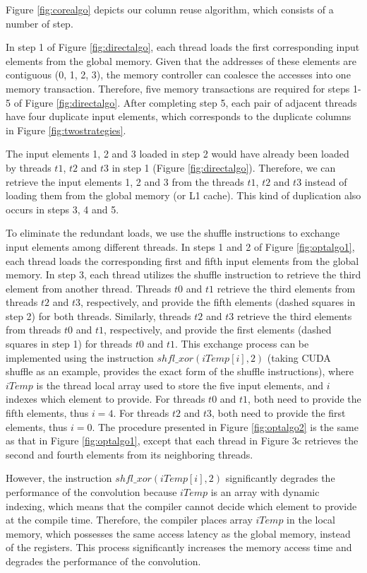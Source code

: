 Figure \ref{fig:corealgo} depicts our column reuse algorithm, which consists of a number of step.

 In step 1 of Figure \ref{fig:directalgo}, each thread loads the first corresponding input elements from the
global memory. Given that the addresses of these elements are contiguous (0, 1, 2, 3), the memory controller can coalesce the accesses into
one memory transaction. Therefore, five memory transactions are required for steps 1-5 of Figure \ref{fig:directalgo}. After completing step 5, each pair of adjacent threads have four
duplicate input elements, which corresponds to the duplicate columns in Figure \ref{fig:twostrategies}.

The input elements 1, 2 and 3 loaded in step 2 would have already been loaded by threads $t1$, $t2$ and $t3$ in step 1 (Figure
\ref{fig:directalgo}). Therefore, we can retrieve the input elements 1, 2 and 3 from the threads $t1$, $t2$ and $t3$ instead of loading
them from the global memory (or L1 cache). This kind of duplication also occurs in steps 3, 4 and 5.

To eliminate the redundant loads, we use the shuffle instructions to exchange input elements among different threads. In steps 1
and 2 of Figure \ref{fig:optalgo1}, each thread loads the corresponding first and fifth input elements from the global memory. In step 3, each
thread utilizes the shuffle instruction to retrieve the third element from another thread. Threads $t0$ and $t1$ retrieve the third elements
from threads $t2$ and $t3$, respectively, and provide the fifth elements (dashed squares in step 2) for both threads.
Similarly, threads $t2$ and $t3$ retrieve the third elements from threads $t0$ and $t1$, respectively, and provide the first
elements (dashed squares in step 1) for threads $t0$ and $t1$. This exchange process can be implemented using the instruction
$shfl\_xor(iTemp[i],2)$ (taking CUDA shuffle as an example, \cite{CUDAtoolkit} provides the exact form of the shuffle instructions), where $iTemp$ is the thread local
array used to store the five input elements, and $i$ indexes which element to provide. For threads $t0$ and $t1$, both need to provide the fifth
elements, thus $i=4$. For threads $t2$ and $t3$, both need to provide the first elements, thus $i=0$. The procedure presented in Figure  \ref{fig:optalgo2} is the same as that in Figure \ref{fig:optalgo1}, except that each thread in Figure 3c retrieves the second and fourth elements from its neighboring threads.

However, the instruction $shfl\_xor(iTemp[i],2)$ significantly degrades the performance of the convolution because $iTemp$ is an array with
dynamic indexing, which means that the compiler cannot decide which element to provide at the compile time. Therefore, the compiler
places array $iTemp$ in the local memory, which possesses the same access latency as the global memory, instead of the registers. This process significantly increases the memory access time and degrades the performance of the convolution.


